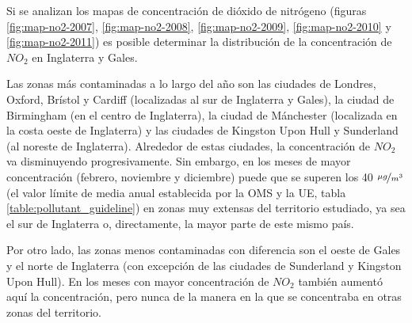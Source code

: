 \documentclass[12pt]{article}
\begin{document}
Si se analizan los mapas de concentración de dióxido de nitrógeno (figuras \ref{fig:map-no2-2007}, \ref{fig:map-no2-2008}, \ref{fig:map-no2-2009}, \ref{fig:map-no2-2010} y \ref{fig:map-no2-2011}) es posible determinar la distribución de la concentración de $NO_{2}$ en Inglaterra y Gales.

Las zonas más contaminadas a lo largo del año son las ciudades de Londres, Oxford, Brístol y Cardiff (localizadas al sur de Inglaterra y Gales), la ciudad de Birmingham (en el centro de Inglaterra), la ciudad de Mánchester (localizada en la costa oeste de Inglaterra) y las ciudades de Kingston Upon Hull y Sunderland (al noreste de Inglaterra). Alrededor de estas ciudades, la concentración de $NO_{2}$ va disminuyendo progresivamente. Sin embargo, en los meses de mayor concentración (febrero, noviembre y diciembre) puede que se superen los 40 $\nicefrac{\mu g}{m^3}$ (el valor límite de media anual establecida por la OMS y la UE, tabla \ref{table:pollutant_guideline}) en zonas muy extensas del territorio estudiado, ya sea el sur de Inglaterra o, directamente, la mayor parte de este mismo país.

Por otro lado, las zonas menos contaminadas con diferencia son el oeste de Gales y el norte de Inglaterra (con excepción de las ciudades de Sunderland y Kingston Upon Hull). En los meses con mayor concentración de $NO_{2}$ también aumentó aquí la concentración, pero nunca de la manera en la que se concentraba en otras zonas del territorio.
\end{document}
